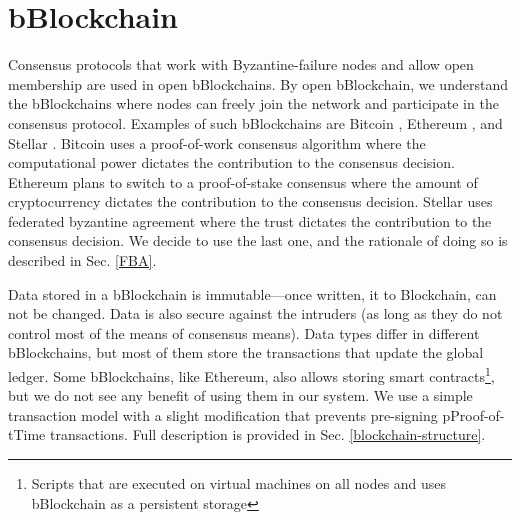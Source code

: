 
\chapter{bBlockchain}
\label{blockchain}
Consensus protocols that work with Byzantine-failure nodes and allow open membership are used in open bBlockchains. By open bBlockchain, we understand the bBlockchains where nodes can freely join the network and participate in the consensus protocol. Examples of such bBlockchains are Bitcoin \cite{nakamoto2008peer}, Ethereum \cite{wood2014ethereum}, and Stellar \cite{mazieres2015stellar}. Bitcoin uses a proof-of-work consensus algorithm where the computational power dictates the contribution to the consensus decision. Ethereum plans to switch to a proof-of-stake consensus where the amount of cryptocurrency dictates the contribution to the consensus decision. Stellar uses federated byzantine agreement where the trust dictates the contribution to the consensus decision. We decide to use the last one, and the rationale of doing so is described in Sec. \ref{FBA}.

Data stored in a bBlockchain is immutable––once written, it to Blockchain, can not be changed. Data is also secure against the intruders (as long as they do not control most of the means of consensus means). Data types differ in different bBlockchains, but most of them store the transactions that update the global ledger. Some bBlockchains, like Ethereum, also allows storing smart contracts\footnote{Scripts that are executed on virtual machines on all nodes and uses bBlockchain as a persistent storage}, but we do not see any benefit of using them in our system. We use a simple transaction model with a slight modification that prevents pre-signing pProof-of-tTime transactions. Full description is provided in Sec. \ref{blockchain-structure}.



